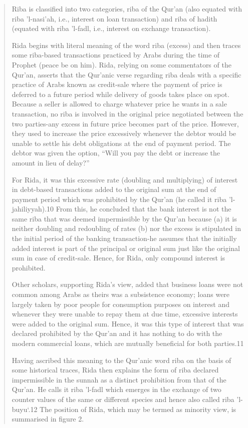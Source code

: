 \begin{quote}
Riba is classified into two categories, riba of the Qur'an (also equated with riba 'l-nasi'ah, i.e., interest on loan transaction) and riba of hadith (equated with riba 'l-fadl, i.e., interest on exchange transaction).

Rida begins with literal meaning of the word riba (excess) and then traces some riba-based transactions practiced by Arabs during the time of Prophet (peace be on him). Rida, relying on some commentators of the Qur'an, asserts that the Qur'anic verse regarding riba deals with a specific practice of Arabs known as credit-sale where the payment of price is deferred to a future period while delivery of goods takes place on spot. Because a seller is allowed to charge whatever price he wants in a sale transaction, no riba is involved in the original price negotiated between the two parties-any excess in future price becomes part of the price. However, they used to increase the price excessively whenever the debtor would be unable to settle his debt obligations at the end of payment period. The debtor was given the option, “Will you pay the debt or increase the amount in lieu of delay?”

For Rida, it was this excessive rate (doubling and multiplying) of interest in debt-based transactions added to the original sum at the end of payment period which was prohibited by the Qur'an (he called it riba 'l-jahiliyyah).10 From this, he concluded that the bank interest is not the same riba that was deemed impermissible by the Qur'an because (a) it is neither doubling and redoubling of rates (b) nor the excess is stipulated in the initial period of the banking transaction-he assumes that the initially added interest is part of the principal or original sum just like the original sum in case of credit-sale. Hence, for Rida, only compound interest is prohibited.

Other scholars, supporting Rida's view, added that business loans were not common among Arabs as theirs was a subsistence economy; loans were largely taken by poor people for consumption purposes on interest and whenever they were unable to repay them at due time, excessive interests were added to the original sum. Hence, it was this type of interest that was declared prohibited by the Qur'an and it has nothing to do with the modern commercial loans, which are mutually beneficial for both parties.11

Having ascribed this meaning to the Qur'anic word riba on the basis of some historical traces, Rida then explains the form of riba declared impermissible in the sunnah as a distinct prohibition from that of the Qur'an. He calls it riba 'l-fadl which emerges in the exchange of two counter values of the same or different species and hence also called riba 'l-buyu‘.12 The position of Rida, which may be termed as minority view, is summarised in figure 2.


\end{quote}
